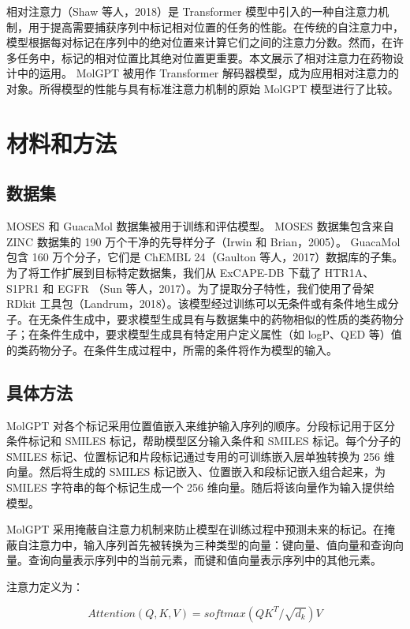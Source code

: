 \begin{translation}
相对注意力（Shaw 等人，2018）是 Transformer 模型中引入的一种自注意力机制，用于提高需要捕获序列中标记相对位置的任务的性能。在传统的自注意力中，模型根据每对标记在序列中的绝对位置来计算它们之间的注意力分数。然而，在许多任务中，标记的相对位置比其绝对位置更重要。本文展示了相对注意力在药物设计中的运用。 MolGPT 被用作 Transformer 解码器模型，成为应用相对注意力的对象。所得模型的性能与具有标准注意力机制的原始 MolGPT 模型进行了比较。

\section{材料和方法}

\subsection{数据集}

MOSES 和 GuacaMol 数据集被用于训练和评估模型。 MOSES 数据集包含来自 ZINC 数据集的 190 万个干净的先导样分子（Irwin 和 Brian，2005）。 GuacaMol 包含 160 万个分子，它们是 ChEMBL 24（Gaulton 等人，2017）数据库的子集。为了将工作扩展到目标特定数据集，我们从 ExCAPE-DB 下载了 HTR1A、S1PR1 和 EGFR （Sun 等人，2017）。为了提取分子特性，我们使用了骨架 RDkit 工具包（Landrum，2018）。该模型经过训练可以无条件或有条件地生成分子。在无条件生成中，要求模型生成具有与数据集中的药物相似的性质的类药物分子；在条件生成中，要求模型生成具有特定用户定义属性（如 logP、QED 等）值的类药物分子。在条件生成过程中，所需的条件将作为模型的输入。

\subsection{具体方法}

MolGPT 对各个标记采用位置值嵌入来维护输入序列的顺序。分段标记用于区分条件标记和 SMILES 标记，帮助模型区分输入条件和 SMILES 标记。每个分子的 SMILES 标记、位置标记和片段标记通过专用的可训练嵌入层单独转换为 256 维向量。然后将生成的 SMILES 标记嵌入、位置嵌入和段标记嵌入组合起来，为 SMILES 字符串的每个标记生成一个 256 维向量。随后将该向量作为输入提供给模型。

MolGPT 采用掩蔽自注意力机制来防止模型在训练过程中预测未来的标记。在掩蔽自注意力中，输入序列首先被转换为三种类型的向量：键向量、值向量和查询向量。查询向量表示序列中的当前元素，而键和值向量表示序列中的其他元素。

注意力定义为：

\begin{equation}
  Attention(Q,K,V)=softmax({QK^T}/ {\sqrt{d_k}})V
\end{equation}


\end{translation}
